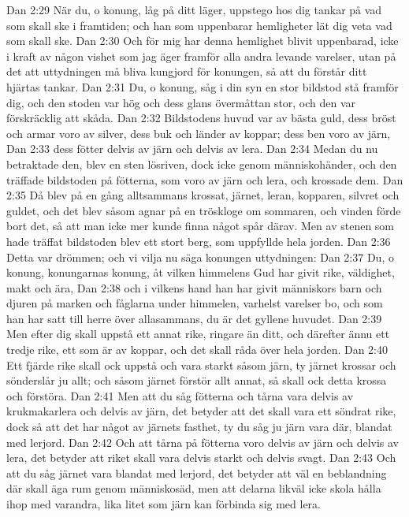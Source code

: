 Dan 2:29  När du, o konung, låg på ditt läger, uppstego hos dig tankar på vad som skall ske i framtiden; och han som uppenbarar hemligheter lät dig veta vad som skall ske.
Dan 2:30  Och för mig har denna hemlighet blivit uppenbarad, icke i kraft av någon vishet som jag äger framför alla andra levande varelser, utan på det att uttydningen må bliva kungjord för konungen, så att du förstår ditt hjärtas tankar.
Dan 2:31  Du, o konung, såg i din syn en stor bildstod stå framför dig, och den stoden var hög och dess glans övermåttan stor, och den var förskräcklig att skåda.
Dan 2:32  Bildstodens huvud var av bästa guld, dess bröst och armar voro av silver, dess buk och länder av koppar; dess ben voro av järn,
Dan 2:33  dess fötter delvis av järn och delvis av lera.
Dan 2:34  Medan du nu betraktade den, blev en sten lösriven, dock icke genom människohänder, och den träffade bildstoden på fötterna, som voro av järn och lera, och krossade dem.
Dan 2:35  Då blev på en gång alltsammans krossat, järnet, leran, kopparen, silvret och guldet, och det blev såsom agnar på en tröskloge om sommaren, och vinden förde bort det, så att man icke mer kunde finna något spår därav. Men av stenen som hade träffat bildstoden blev ett stort berg, som uppfyllde hela jorden.
Dan 2:36  Detta var drömmen; och vi vilja nu säga konungen uttydningen:
Dan 2:37  Du, o konung, konungarnas konung, åt vilken himmelens Gud har givit rike, väldighet, makt och ära,
Dan 2:38  och i vilkens hand han har givit människors barn och djuren på marken och fåglarna under himmelen, varhelst varelser bo, och som han har satt till herre över allasammans, du är det gyllene huvudet.
Dan 2:39  Men efter dig skall uppstå ett annat rike, ringare än ditt, och därefter ännu ett tredje rike, ett som är av koppar, och det skall råda över hela jorden.
Dan 2:40  Ett fjärde rike skall ock uppstå och vara starkt såsom järn, ty järnet krossar och sönderslår ju allt; och såsom järnet förstör allt annat, så skall ock detta krossa och förstöra.
Dan 2:41  Men att du såg fötterna och tårna vara delvis av krukmakarlera och delvis av järn, det betyder att det skall vara ett söndrat rike, dock så att det har något av järnets fasthet, ty du såg ju järn vara där, blandat med lerjord.
Dan 2:42  Och att tårna på fötterna voro delvis av järn och delvis av lera, det betyder att riket skall vara delvis starkt och delvis svagt.
Dan 2:43  Och att du såg järnet vara blandat med lerjord, det betyder att väl en beblandning där skall äga rum genom människosäd, men att delarna likväl icke skola hålla ihop med varandra, lika litet som järn kan förbinda sig med lera.
